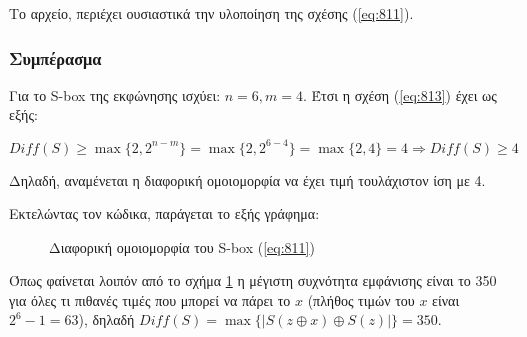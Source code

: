 Το αρχείο, περιέχει ουσιαστικά την υλοποίηση της σχέσης (\ref{eq:811}). 

\subsubsection{Συμπέρασμα}

Για το S-box της εκφώνησης ισχύει: $n = 6, m = 4$. Έτσι η σχέση (\ref{eq:813}) έχει ως εξής: 

\begin{equation}
    Diff(S) \ge \max \{2, 2^{n-m}\} = \max \{2, 2^{6-4}\} = \max \{2, 4\} = 4 \Rightarrow Diff(S) \ge 4
\end{equation}

Δηλαδή, αναμένεται η διαφορική ομοιομορφία να έχει τιμή τουλάχιστον ίση με 4.

Εκτελώντας τον κώδικα, παράγεται το εξής γράφημα:

\begin{figure}[H]
    \begin{center}
        \scalebox{0.6}{}
    \end{center}
    \caption{Διαφορική ομοιομορφία του S-box (\ref{eq:811})}
    \label{fig:81}
\end{figure}

Όπως φαίνεται λοιπόν από το σχήμα \ref{fig:81} η μέγιστη συχνότητα εμφάνισης είναι το 350 για όλες τι πιθανές τιμές που μπορεί να πάρει το $x$ (πλήθος τιμών του $x$ είναι $2^6 - 1 = 63$), δηλαδή $Diff(S) = \max \{|S(z \oplus x) \oplus S(z)|\} = 350$.